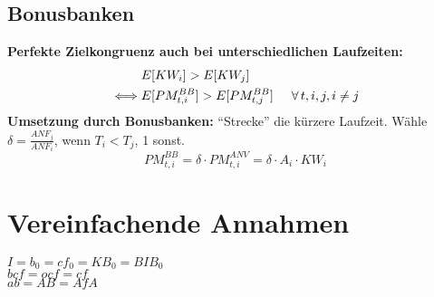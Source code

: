 \documentclass[leqno]{scrartcl}
\begin{document}
\begin{multicols}{4}
\subsection{Bonusbanken}

\textbf{Perfekte Zielkongruenz auch bei unterschiedlichen Laufzeiten:}
  \begin{align*}
    &E[KW_i] > E[KW_j]\\
    \iff & E[PM^{BB}_{t,i}] > E[PM^{BB}_{t,j}] \hspace{0.5cm} \forall\, t,i,j,i \neq j
  \end{align*}
\textbf{Umsetzung durch Bonusbanken:}
``Strecke'' die kürzere Laufzeit. Wähle $\delta = \frac{ANF_j}{ANF_i}$, wenn $T_i < T_j$, 1 sonst.
  \begin{equation*}
    PM^{BB}_{t,i} = \delta \cdot PM^{ANV}_{t,i} = \delta \cdot A_{i} \cdot KW_i
  \end{equation*}


\appendix 
\section{Vereinfachende Annahmen}
$I=b_0=cf_0=KB_0=BIB_0$\\
$bcf=ocf=cf$\\
$ab=AB=AfA$  


\end{multicols}
\end{document}
